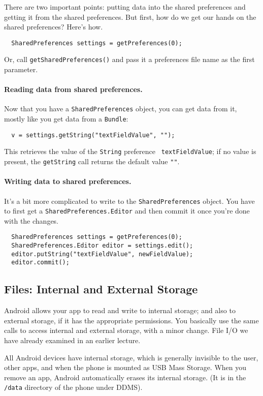 There are two important points: putting data into the shared preferences
and getting it from the shared preferences. But first, how do we get our
hands on the shared preferences? Here's how.
\begin{lstlisting}
  SharedPreferences settings = getPreferences(0);
\end{lstlisting}
Or, call {\tt getSharedPreferences()} and pass it a preferences file
name as the first parameter.

\paragraph{Reading data from shared preferences.}
Now that you have a {\tt SharedPreferences} object, you can get data from it, 
mostly like you get data from a {\tt Bundle}:
\begin{lstlisting}
  v = settings.getString("textFieldValue", "");
\end{lstlisting}
This retrieves the value of the {\tt String} preference {\tt
  textFieldValue}; if no value is present, the {\tt getString} call
returns the default value {\tt ""}.

\paragraph{Writing data to shared preferences.}
It's a bit more complicated to write to the {\tt SharedPreferences}
object.  You have to first get a {\tt SharedPreferences.Editor} and
then commit it once you're done with the changes.

\begin{lstlisting}
  SharedPreferences settings = getPreferences(0);
  SharedPreferences.Editor editor = settings.edit();
  editor.putString("textFieldValue", newFieldValue);
  editor.commit();
\end{lstlisting}

\subsection*{Files: Internal and External Storage}
Android allows your app to read and write to internal storage; and
also to external storage, if it has the appropriate permissions. You
basically use the same calls to access internal and external storage,
with a minor change. File I/O we have already examined in an earlier lecture.

All Android devices have internal storage, which is generally
invisible to the user, other apps, and when the phone is mounted as
USB Mass Storage. When you remove an app, Android automatically
erases its internal storage. (It is in the {\tt /data} directory of the phone
under DDMS).

